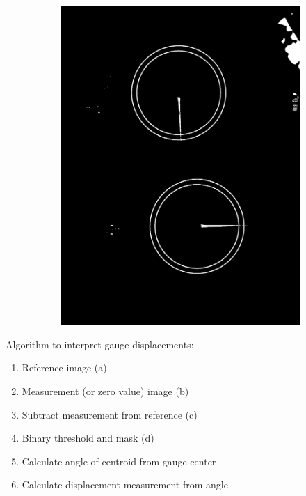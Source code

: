 \documentclass[mathserif]{beamer}
\begin{document}
\begin{frame}
\begin{figure}
\begin{subfigure}[b]{0.2\textwidth}
            \includegraphics[width=\textwidth]{threshold_img}
            \caption{}
        \end{subfigure}
    \end{figure}
    Algorithm to interpret gauge displacements:
        \begin{enumerate}
            \item Reference image (a)
            \item Measurement (or zero value) image (b)
            \item Subtract measurement from reference (c) 
            \item Binary threshold and mask (d)
            \item Calculate angle of centroid from gauge center
            \item Calculate displacement measurement from angle
        \end{enumerate}
\end{frame}
\end{document}
